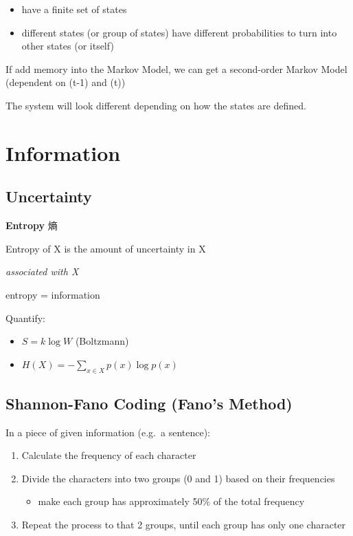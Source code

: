 \documentclass[a4paper, openany]{book}
\begin{document}
\begin{itemize}
  \item have a finite set of states
  \item different states (or group of states) have different probabilities to
  turn into other states (or itself)
\end{itemize}

If add memory into the Markov Model, we can get a second-order Markov
Model (dependent on (t-1) and (t))

The system will look different depending on how the states are defined.

\section{Information}

\subsection{Uncertainty}

\textbf{Entropy} 熵

Entropy of X is the amount of uncertainty in X

\emph{associated with X}

entropy = information

Quantify:

\begin{itemize}
  \item \(S = \mathit{k} \log W\) (Boltzmann)
  \item \(H ( X ) = -\sum_{\mathit{x}\in X}^{} p ( \mathit{x} ) \log p ( \mathit{x} )\)
\end{itemize}

\subsection{Shannon-Fano Coding (Fano's
Method)}

In a piece of given information (e.g.~a sentence):

\begin{enumerate}
  \item Calculate the frequency of each character
  \item Divide the characters into two groups (0 and 1) based on their
  frequencies
  \begin{itemize}
    \item make each group has approximately 50\% of the total frequency
  \end{itemize}
  \item Repeat the process to that 2 groups, until each group has only one
  character
\end{enumerate}
\end{document}
